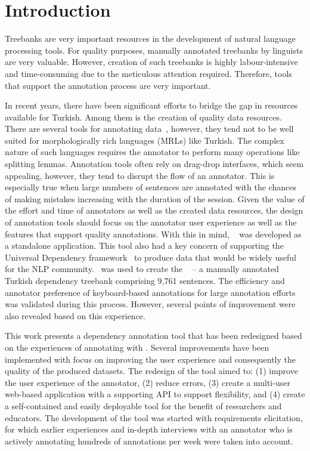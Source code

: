 \section{Introduction}
\label{sec:introduction}

Treebanks are very important resources in the development of natural language processing tools.
For quality purposes, manually annotated treebanks by linguists are very valuable. 
However, creation of such treebanks is highly labour-intensive and time-consuming due to the meticulous attention required.
Therefore, tools that support the annotation process are very important. 

In recent years, there have been significant efforts to bridge the gap in resources available for Turkish. 
Among them is the creation of quality data resources. 
There are several tools for annotating data~\cite{brat,dgannotator}, however, they tend not to be well suited for morphologically rich languages (MRLs) like Turkish.
The complex nature of such languages requires the annotator to perform many operations like splitting lemmas.
Annotation tools often rely on drag-drop interfaces, which seem appealing, however, they tend to disrupt the flow of an annotator. 
This is especially true when large numbers of sentences are annotated with the chances of making mistakes increasing with the duration of the session. 
Given the value of the effort and time of annotators as well as the created data resources, the design of annotation tools should focus on the annotator user experience as well as the features that support quality annotations. 
With this in mind, \boatvone~\cite{trk2020resources} was developed as a standalone application.
This tool also had a key concern of supporting the Universal Dependency framework~\cite{UD} to produce data that would be widely useful for the NLP community.
\boatvone\ was used to create the \bountreebank~\cite{turk-etal-2019-turkish,trk2020resources,UD-Boun-Treebank} -- a manually annotated Turkish dependency treebank comprising 9,761 sentences.
The efficiency and annotator preference of keyboard-based annotations for large annotation efforts was validated during this process. 
However, several points of improvement were also revealed based on this experience.

This work presents a dependency annotation tool that has been redesigned based on the experiences of annotating with \boatvone.
Several improvements have been implemented with focus on improving the user experience and consequently the quality of the produced datasets.
The redesign of the tool aimed to: (1) improve the user experience of the annotator, (2) reduce errors, (3) create a multi-user web-based application with a supporting API to support flexibility, and (4) create a self-contained and easily deployable tool for the benefit of researchers and educators. 
The development of the tool was started with requirements elicitation, for which earlier experiences and in-depth interviews with an annotator who is actively annotating hundreds of annotations per week were taken into account.

